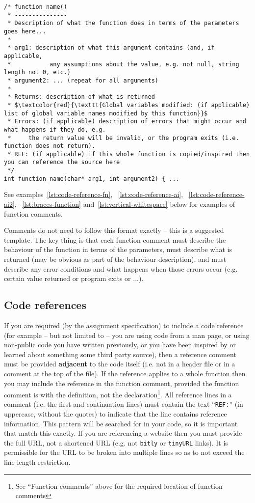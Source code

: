\documentclass{article}
\begin{document}
\nolinenumbers
\begin{lstlisting}[mathescape=true]
/* function_name()
 * ---------------
 * Description of what the function does in terms of the parameters goes here...
 *
 * arg1: description of what this argument contains (and, if applicable, 
 *           any assumptions about the value, e.g. not null, string length not 0, etc.)
 * argument2: ... (repeat for all arguments)
 *
 * Returns: description of what is returned
 * $\textcolor{red}{\texttt{Global variables modified: (if applicable) list of global variable names modified by this function}}$
 * Errors: (if applicable) description of errors that might occur and what happens if they do, e.g.
 *     the return value will be invalid, or the program exits (i.e. function does not return). 
 * REF: (if applicable) if this whole function is copied/inspired then you can reference the source here
 */
int function_name(char* arg1, int argument2) { ...
\end{lstlisting}
\linenumbers

See examples~\ref{lst:code-reference-fn}, ~\ref{lst:code-reference-ai}, ~\ref{lst:code-reference-ai2}, ~\ref{lst:braces-function} and~\ref{lst:vertical-whitespace} below for examples of function 
comments.

Comments do not need to follow this format exactly -- this is a suggested template. The key thing is that each function comment 
must describe the behaviour of the function in terms of the parameters, must describe what is returned (may be obvious as 
part of the behaviour description), and must describe any error conditions and what happens when those errors occur (e.g.
certain value returned or program exits or ...).

\subsection{Code references}
If you are required (by the assignment specification) 
to include a code reference (for example -- but not limited to -- you are using code from a man page, or using non-public code you have 
written previously, or you have been inspired by or learned about something some third party source), then a reference comment must be provided
\textbf{adjacent} to the code itself (i.e. not in a header file or in a comment at the top of the file). If the reference applies to a whole
function then you may include the reference in the function comment, provided the function comment is with the definition, not the declaration\footnote{See ``Function comments'' above for the required location of function comments}. All reference lines 
in a comment (i.e. the first and continuation lines) must contain the text ``\texttt{REF:}'' (in uppercase, 
without the quotes) to indicate that the line contains reference information. This pattern will be searched for in your code, so it is important that match this exactly. If you are referencing a website then you must provide the full URL, not a shortened URL (e.g. not \texttt{bitly} or \texttt{tinyURL} links). 
It is permissible for the URL to be broken into multiple lines so as to not exceed the line length restriction.
\end{document}
